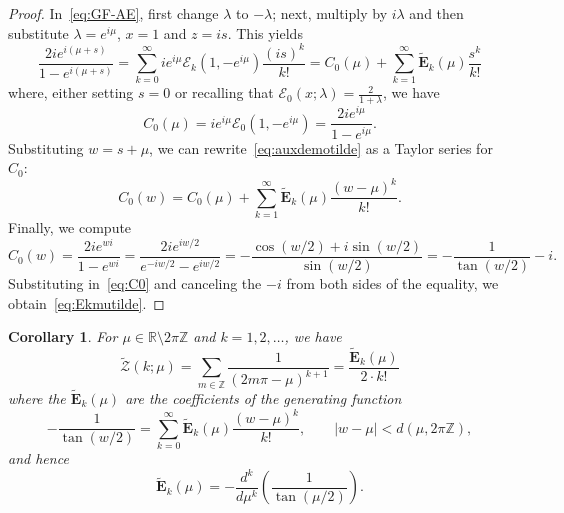 \documentclass[11pt, oneside]{article}
\newcommand{\Z}{\mathbb{Z}}
\newcommand{\R}{\mathbb{R}}
\newcommand{\calE}{\mathcal{E}}
\newcommand{\bfE}{\mathbf{E}}
\newcommand{\calZ}{\mathcal{Z}}
\theoremstyle{plain}
\newtheorem{corollary}[theorem]{Corollary}
\theoremstyle{definition}
\begin{document}
\begin{proof} 
In~\eqref{eq:GF-AE}, first change $\lambda$ to $-\lambda$; next, multiply by $i\lambda$ and then substitute $\lambda = e^{i\mu}$, $x = 1$ and $z = is$. This yields
\begin{equation}
\label{eq:auxdemotilde}
  \frac{2i e^{i (\mu + s)}}{1 - e^{i (\mu + s)}}
  = \sum_{k=0}^\infty i e^{i\mu} \calE_k(1,-e^{i\mu}) \frac{(is)^k}{k!}
  = C_0(\mu) + \sum_{k=1}^\infty \widetilde{\bfE}_k(\mu) \frac{s^k}{k!}
\end{equation}
where, either setting $s = 0$ or recalling that $\calE_{0}(x; \lambda) = \frac{2}{1 + \lambda}$, we have
\[
  C_0(\mu) = i e^{i\mu} \calE_{0}(1,-e^{i\mu})
  = \frac{2 i e^{i \mu}}{1 - e^{i \mu}}.
\] 
Substituting $w = s + \mu$, we can rewrite~\eqref{eq:auxdemotilde} as a Taylor series for~$C_0$:
\begin{equation}
\label{eq:C0}
  C_0(w) = C_0(\mu) +  \sum_{k=1}^\infty \widetilde{\bfE}_k(\mu) \frac{(w-\mu)^k}{k!}.
\end{equation}
Finally, we compute
\[
  C_0(w) = \frac{2i e^{wi}}{1 - e^{wi}}
  = \frac{2 i e^{i w/2}}{e^{-iw/2} - e^{iw/2}}
  = -\frac{\cos(w/2) + i \sin(w/2)}{\sin(w/2)}
  = -\frac{1}{\tan(w/2)} - i.
\]
Substituting in~\eqref{eq:C0} and canceling the $-i$ from both sides of the equality, we obtain~\eqref{eq:Ekmutilde}.
\end{proof}

\begin{corollary}
\label{cor:summusa}
For $\mu \in \R \setminus 2\pi\Z$ and $k = 1,2,\dots$, we have
\[
  \widetilde{\calZ}(k;\mu) = \sum_{m\in\Z} \frac{1}{(2m\pi - \mu)^{k+1}}
  = \frac{\widetilde{\bfE}_k(\mu)}{2 \cdot k!}
\]
where the $\widetilde{\bfE}_k(\mu)$ are the coefficients of the generating function
\begin{equation*}
  -\frac{1}{\tan(w/2)} = \sum_{k=0}^{\infty} \widetilde{\bfE}_k(\mu) \frac{(w-\mu)^k}{k!},
  \qquad |w - \mu| < d(\mu, 2\pi\Z), 
\end{equation*}
and hence
\[
  \widetilde{\bfE}_k(\mu) = -\frac{d^k}{d\mu^k} \left(\frac{1}{\tan(\mu/2)}\right).
\]
\end{corollary}
\end{document}
